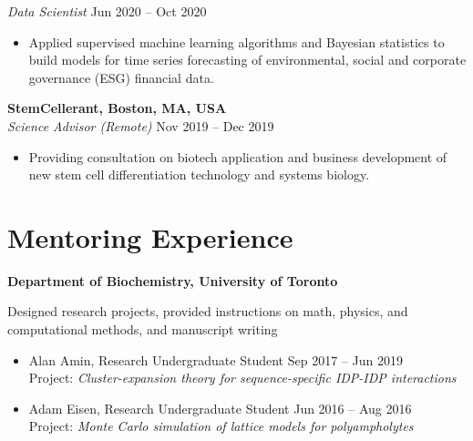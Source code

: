 \documentclass[11pt]{../yhlcv}
\begin{document}
{\it Data Scientist} \hfill Jun 2020 -- Oct 2020\vspace{-0.5em}\\
\begin{itemize}[leftmargin=*]\itemsep-0.2em
\item Applied supervised machine learning algorithms and Bayesian statistics to build models for time series
forecasting of environmental, social and corporate governance (ESG) financial data.
\end{itemize}

{\bf StemCellerant, Boston, MA, USA}\vspace{0.2em} \\ 

{\it Science Advisor (Remote)} \hfill Nov 2019 -- Dec 2019\vspace{-0.5em}\\
\begin{itemize}[leftmargin=*]\itemsep-0.2em
\item Providing consultation on biotech application and business development of new stem cell differentiation technology and systems biology.
\end{itemize}

\section*{Mentoring Experience}

{\bf Department of Biochemistry, University of Toronto} \vspace{0.25em}

Designed research projects, provided instructions on math, physics, and computational methods, 
and manuscript writing
\vspace{-0.5em}\\
\begin{itemize}[leftmargin=*]\itemsep-0.2em
\item Alan Amin, %
Research Undergraduate Student
\hfill Sep 2017 -- Jun 2019 \\
Project: {\it Cluster-expansion theory for sequence-specific IDP-IDP interactions}

\item Adam Eisen, %
Research Undergraduate Student
\hfill Jun 2016 -- Aug 2016 \\
Project: {\it Monte Carlo simulation of lattice models for polyampholytes} 
\end{itemize}
\end{document}

